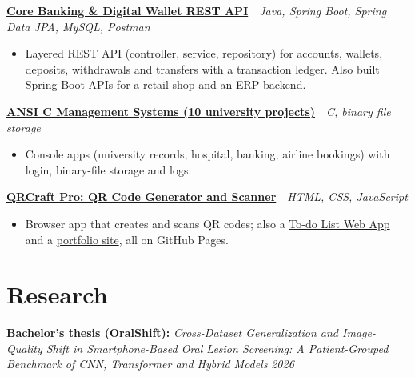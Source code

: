 \documentclass[10pt, letterpaper]{article}
\newcommand{\project}[3]{%
    \textbf{\href{#2}{#1}} \,\textbar\, {\small\textit{#3}}%
}
\begin{document}
\vspace{3pt}
\project{Core Banking \& Digital Wallet REST API}%
{https://github.com/SameeulKhondokerJisan/core-banking-digital-wallet-system}%
{Java, Spring Boot, Spring Data JPA, MySQL, Postman}
\begin{itemize}
    \item Layered REST API (controller, service, repository) for accounts, wallets, deposits, withdrawals and
          transfers with a transaction ledger. Also built Spring Boot APIs for a
          \href{https://github.com/SameeulKhondokerJisan/springboot-super-shop-api}{retail shop} and an
          \href{https://github.com/SameeulKhondokerJisan/enterprise-erp-system}{ERP backend}.
\end{itemize}

\vspace{3pt}
\project{ANSI C Management Systems (10 university projects)}%
{https://github.com/SameeulKhondokerJisan/university-academic-research-management-system}%
{C, binary file storage}
\begin{itemize}
    \item Console apps (university records, hospital, banking, airline bookings) with login, binary-file storage and logs.
\end{itemize}

\vspace{3pt}
\project{QRCraft Pro: QR Code Generator and Scanner}%
{https://sameeulkhondokerjisan.github.io/qr-code-generator/}%
{HTML, CSS, JavaScript}
\begin{itemize}
    \item Browser app that creates and scans QR codes; also a
          \href{https://sameeulkhondokerjisan.github.io/todo-list-webapp/}{To-do List Web App} and a
          \href{https://sameeulkhondokerjisan.github.io/my-portfolio/}{portfolio site}, all on GitHub Pages.
\end{itemize}

\section{Research}

\textbf{Bachelor's thesis (OralShift):} \textit{Cross-Dataset Generalization and Image-Quality Shift in
Smartphone-Based Oral Lesion Screening: A Patient-Grouped Benchmark of CNN, Transformer and Hybrid Models}
\hfill {\small\textit{2026}}
\end{document}
